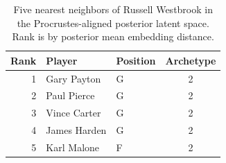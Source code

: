 \begin{table}[htbp]
  \centering\small
  \begin{tabular}{rllc}
    \toprule
    Rank & Player & Position & Archetype \\
    \midrule
    1 & Gary Payton & G & 2 \\
    2 & Paul Pierce & G & 2 \\
    3 & Vince Carter & G & 2 \\
    4 & James Harden & G & 2 \\
    5 & Karl Malone & F & 2 \\
    \bottomrule
  \end{tabular}
  \caption{Five nearest neighbors of Russell Westbrook in the Procrustes-aligned posterior latent space. Rank is by posterior mean embedding distance.}
\end{table}

